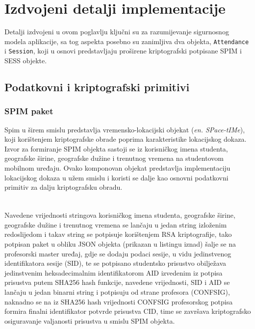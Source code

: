 \chapter{Izdvojeni detalji implementacije}
Detalji izdvojeni u ovom poglavlju ključni su za razumijevanje sigurnosnog modela aplikacije, sa tog aspekta posebno su zanimljiva dva objekta, \texttt{Attendance} i \texttt{Session}, koji u osnovi predstavljaju proširene kriptografski potpisane SPIM i SESS objekte.

\section{Podatkovni i kriptografski primitivi}
\subsection{SPIM paket}
Spim u širem smislu predstavlja vremensko-lokacijski objekat (\textit{en. SPace-tIMe}), koji korištenjem kriptografske obrade poprima karakteristike lokacijskog dokaza. Izvor za formiranje SPIM objekta sastoji se iz korisničkog imena studenta, geografske širine, geografske dužine i trenutnog vremena na studentovom mobilnom uređaju. Ovako komponovan objekat predstavlja implementaciju lokacijskog dokaza u užem smislu i koristi se dalje kao osnovni podatkovni primitiv za dalju kriptografsku obradu.

\inputminted{text}{material/logit_tag.txt}

\paragraph*{}
Navedene vrijednosti stringova korisničkog imena studenta, geografske širine, geografske dužine i trenutnog vremena se lančaju u jedan string izloženim redoslijedom i takav string se potpisuje korištenjem RSA kriptografije, tako potpisan paket u obliku JSON objekta (prikazan u listingu iznad) šalje se na profesorski master uređaj, gdje se dodaju podaci sesije, u vidu jedinstvenog identifikatora sesije (SID), te se potpisano studentsko prisustvo obilježava jedinstvenim heksadecimalnim identifikatorom AID izvedenim iz potpisa prisustva putem SHA256 hash funkcije, navedene vrijednosti, SID i AID se lančaju u jedan binarni string i potpisuju od strane profesora (CONFSIG), naknadno se na iz SHA256 hash vrijednosti CONFSIG profesorskog potpisa formira finalni identifikator potvrde prisustva CID, time se završava kriptografsko osiguravanje valjanosti prisustva u smislu SPIM objekta.


